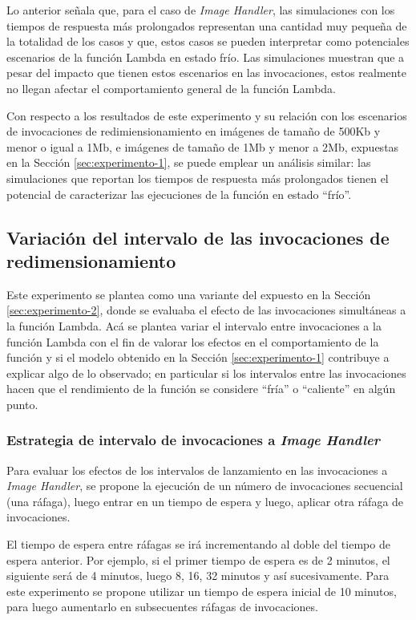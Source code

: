 Lo anterior señala que, para el caso de \emph{Image Handler}, las simulaciones con los tiempos de respuesta más prolongados representan una cantidad muy pequeña de la totalidad de los casos y que, estos casos se pueden interpretar como potenciales escenarios de la función Lambda en estado frío. Las simulaciones muestran que a pesar del impacto que tienen estos escenarios en las invocaciones, estos realmente no llegan afectar el comportamiento general de la función Lambda. 

Con respecto a los resultados de este experimento y su relación con los escenarios de invocaciones de redimiensionamiento en imágenes de tamaño de 500Kb y menor o igual a 1Mb, e imágenes de tamaño de 1Mb y menor a 2Mb, expuestas en la Sección \ref{sec:experimento-1}, se puede emplear un análisis similar: las simulaciones que reportan los tiempos de respuesta más prolongados tienen el potencial de caracterizar las ejecuciones de la función en estado ``frío''.

\subsection{Variación del intervalo de las invocaciones de redimensionamiento}\label{sec:experimento-3}

Este experimento se plantea como una variante del expuesto en la Sección \ref{sec:experimento-2}, donde se evaluaba el efecto de las invocaciones simultáneas a la función Lambda. Acá se plantea variar el intervalo entre invocaciones a la función Lambda con el fin de valorar los efectos en el comportamiento de la función y si el modelo obtenido en la Sección \ref{sec:experimento-1} contribuye a explicar algo de lo observado; en particular si los intervalos entre las invocaciones hacen que el rendimiento de la función se considere ``fría'' o ``caliente'' en algún punto.

\subsubsection{Estrategia de intervalo de invocaciones a \emph{Image Handler}}
Para evaluar los efectos de los intervalos de lanzamiento en las invocaciones a \emph{Image Handler}, se propone la ejecución de un número de invocaciones secuencial (una ráfaga), luego entrar en un tiempo de espera y luego, aplicar otra ráfaga de invocaciones. 

El tiempo de espera entre ráfagas se irá incrementando al doble del tiempo de espera anterior. Por ejemplo, si el primer tiempo de espera es de 2 minutos, el siguiente será de 4 minutos, luego 8, 16, 32 minutos y así sucesivamente. Para este experimento se propone utilizar un tiempo de espera inicial de 10 minutos, para luego aumentarlo en subsecuentes ráfagas de invocaciones.


